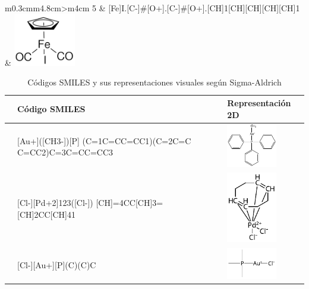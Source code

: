 \begin{landscape}
\begin{table}
\begin{minipage}{.5\linewidth}
\begin{tabular}{m{0.3cm}m{4.8cm}>{\centering\arraybackslash}m{4cm}}
        5 &
        [Fe]I.[C-]\#[O+].[C-]\#[O+].[CH]1[CH][CH][CH][CH]1 & \includegraphics[width=2.7cm]{imagenes/sigmaAldrich/Dicarbonylcyclopentadienyliodoiron(II).png} \\
        \bottomrule
        \end{tabular}
    \caption{Códigos SMILES y sus representaciones visuales según Sigma-Aldrich}
    \label{tabla:tabla_peq_intro_sigmaAldrich}
  \end{minipage}%
  \begin{minipage}{.5\linewidth}
    \centering
    \begin{tabular}{m{0.1cm}m{4.8cm}>{\centering\arraybackslash}m{4cm}}
        \toprule
        & \textbf{Código SMILES} & \textbf{Representación 2D} \\
        \midrule
        &
        [Au+]([CH3-])[P] (C=1C=CC=CC1)(C=2C=C C=CC2)C=3C=CC=CC3 & \includegraphics[width=2.2cm]{imagenes/sciFinder/pdf/Methyl(triphenylphosphine)gold(I).pdf} \\

        &
        [Cl-][Pd+2]123([Cl-]) [CH]=4CC[CH]3=[CH]2CC[CH]41 & \includegraphics[width=2.2cm]{imagenes/sciFinder/pdf/Dichloro(1,5-cyclooctadiene)palladium(II).pdf} \\

        &
        [Cl-][Au+][P](C)(C)C & \includegraphics[width=2.2cm]{imagenes/sciFinder/pdf/Chloro(trimethylphosphine)gold(I).pdf} \\
        

\end{tabular}
\end{minipage}
\end{table}
\end{landscape}
